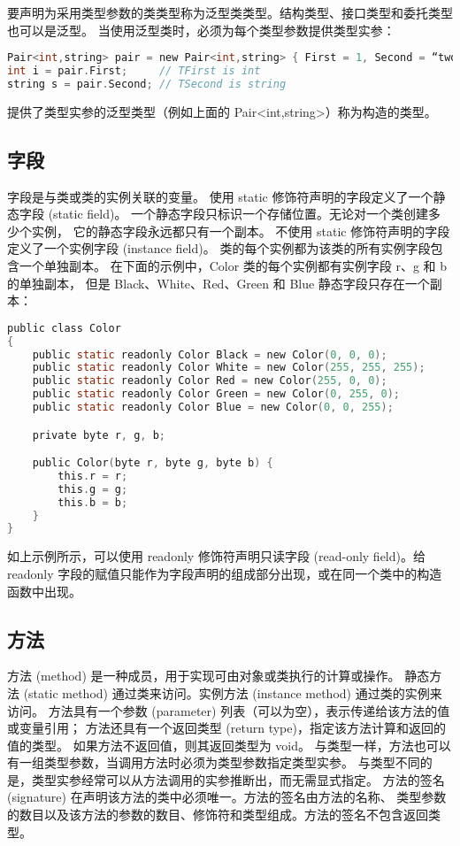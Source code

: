 要声明为采用类型参数的类类型称为泛型类类型。结构类型、接口类型和委托类型也可以是泛型。
当使用泛型类时，必须为每个类型参数提供类型实参：

 \begin{lstlisting}[language=C]
Pair<int,string> pair = new Pair<int,string> { First = 1, Second = “two” };
int i = pair.First;     // TFirst is int
string s = pair.Second; // TSecond is string
 \end{lstlisting}

提供了类型实参的泛型类型（例如上面的 Pair<int,string>）称为构造的类型。

\subsection{字段}
字段是与类或类的实例关联的变量。
使用 static 修饰符声明的字段定义了一个静态字段 (static field)。
一个静态字段只标识一个存储位置。无论对一个类创建多少个实例，
它的静态字段永远都只有一个副本。
不使用 static 修饰符声明的字段定义了一个实例字段 (instance field)。
类的每个实例都为该类的所有实例字段包含一个单独副本。
在下面的示例中，Color 类的每个实例都有实例字段 r、g 和 b 的单独副本，
但是 Black、White、Red、Green 和 Blue 静态字段只存在一个副本：

 \begin{lstlisting}[language=C]
public class Color
{
    public static readonly Color Black = new Color(0, 0, 0);
    public static readonly Color White = new Color(255, 255, 255);
    public static readonly Color Red = new Color(255, 0, 0);
    public static readonly Color Green = new Color(0, 255, 0);
    public static readonly Color Blue = new Color(0, 0, 255);

    private byte r, g, b;

    public Color(byte r, byte g, byte b) {
        this.r = r;
        this.g = g;
        this.b = b;
    }
}
 \end{lstlisting}

如上示例所示，可以使用 readonly 修饰符声明只读字段 (read-only field)。给 readonly 字段的赋值只能作为字段声明的组成部分出现，或在同一个类中的构造函数中出现。

\subsection{方法}

方法 (method) 是一种成员，用于实现可由对象或类执行的计算或操作。
静态方法 (static method) 通过类来访问。实例方法 (instance method) 通过类的实例来访问。
方法具有一个参数 (parameter) 列表（可以为空），表示传递给该方法的值或变量引用；
方法还具有一个返回类型 (return type)，指定该方法计算和返回的值的类型。
如果方法不返回值，则其返回类型为 void。
与类型一样，方法也可以有一组类型参数，当调用方法时必须为类型参数指定类型实参。
与类型不同的是，类型实参经常可以从方法调用的实参推断出，而无需显式指定。
方法的签名 (signature) 在声明该方法的类中必须唯一。方法的签名由方法的名称、
类型参数的数目以及该方法的参数的数目、修饰符和类型组成。方法的签名不包含返回类型。

